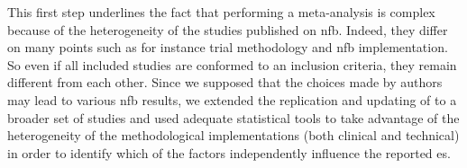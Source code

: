 This first step underlines the fact that performing a meta-analysis is complex because of the heterogeneity 
of the studies published on \gls{nfb}. Indeed, they differ on many points such as for instance trial
 methodology and \gls{nfb} implementation. So even if all included studies are conformed to an 
inclusion criteria, they remain different from each other. Since we supposed 
that the choices made by authors may lead to various \gls{nfb} results, we extended the replication 
and updating of \citet{Cortese2016} to a broader set of studies and used 
adequate statistical tools to take advantage of the heterogeneity of the methodological implementations 
(both clinical and technical) in order to identify which of the factors 
independently influence the reported \gls{es}. 






